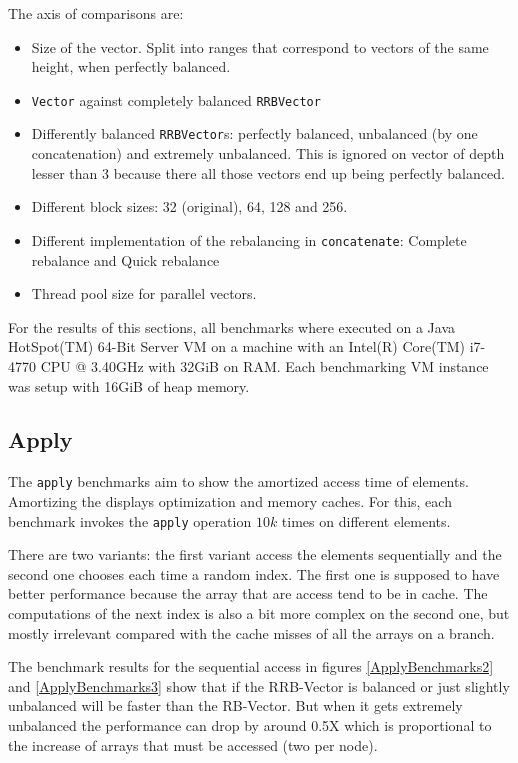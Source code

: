The axis of comparisons are: 
\begin{itemize}
	\item Size of the vector. Split into ranges that correspond to vectors of the same height, when perfectly balanced.
	\item \texttt{Vector} against completely balanced \texttt{RRBVector}
	\item Differently balanced \texttt{RRBVector}s: perfectly balanced, unbalanced (by one concatenation) and extremely unbalanced. This is ignored on vector of depth lesser than 3 because there all those vectors end up being perfectly balanced.
	\item Different block sizes: 32 (original), 64, 128 and 256.
	\item Different implementation of the rebalancing in \texttt{concatenate}: Complete rebalance and Quick rebalance
	\item Thread pool size for parallel vectors.
\end{itemize}

For the results of this sections, all benchmarks where executed on a Java HotSpot(TM) 64-Bit Server VM on a machine with an Intel(R) Core(TM) i7-4770 CPU @ 3.40GHz with 32GiB on RAM. Each benchmarking VM instance was setup with 16GiB of heap memory. 

\subsection{Apply}
The \texttt{apply} benchmarks aim to show the amortized access time of elements. Amortizing the displays optimization and memory caches. For this, each benchmark invokes the \texttt{apply} operation $10k$ times on different elements. 

There are two variants: the first variant access the elements sequentially and the second one chooses each time a random index. The first one is supposed to have better performance because the array that are access tend to be in cache. The computations of the next index is also a bit more complex on the second one, but mostly irrelevant compared with the cache misses of all the arrays on a branch.

The benchmark results for the sequential access in figures \ref{ApplyBenchmarks2} and \ref{ApplyBenchmarks3} show that if the RRB-Vector is balanced or just slightly unbalanced will be faster than the RB-Vector. But when it gets extremely unbalanced the performance can drop by around 0.5X which is proportional to the increase of arrays that must be accessed (two per node).

